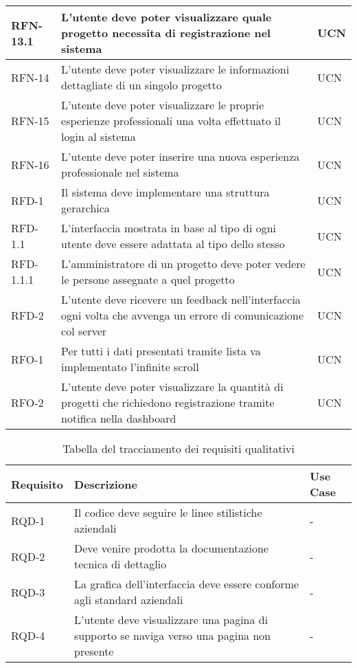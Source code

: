 \begin{table}
\begin{tabularx}{\textwidth}{lXl}
\hline
RFN-13.1 & L'utente deve poter visualizzare quale progetto necessita di registrazione nel sistema & UCN \\
\hline
RFN-14 & L'utente deve poter visualizzare le informazioni dettagliate di un singolo progetto & UCN \\
\hline
RFN-15 & L'utente deve poter visualizzare le proprie esperienze professionali una volta effettuato il login al sistema & UCN \\
\hline
RFN-16 & L'utente deve poter inserire una nuova esperienza professionale nel sistema & UCN \\
\hline
RFD-1 & Il sistema deve implementare una struttura gerarchica & UCN \\
\hline
RFD-1.1 & L'interfaccia mostrata in base al tipo di ogni utente deve essere adattata al tipo dello stesso & UCN \\
\hline
RFD-1.1.1 & L'amministratore di un progetto deve poter vedere le persone assegnate a quel progetto & UCN \\
\hline
RFD-2 & L'utente deve ricevere un feedback nell'interfaccia ogni volta che avvenga un errore di comunicazione col server & UCN \\
\hline
RFO-1 & Per tutti i dati presentati tramite lista va implementato l'infinite scroll & UCN \\
\hline
RFO-2 & L'utente deve poter visualizzare la quantità di progetti che richiedono registrazione tramite notifica nella dashboard & UCN \\
\hline
\end{tabularx}
\end{table}%

\begin{table}%
\caption{Tabella del tracciamento dei requisiti qualitativi}
\label{tab:requisiti-qualitativi}
\begin{tabularx}{\textwidth}{lXl}
\hline\hline
\textbf{Requisito} & \textbf{Descrizione} & \textbf{Use Case}\\
\hline
RQD-1 & Il codice deve seguire le linee stilistiche aziendali & - \\
\hline
RQD-2 & Deve venire prodotta la documentazione tecnica di dettaglio & - \\
\hline
RQD-3 & La grafica dell'interfaccia deve essere conforme agli standard aziendali & - \\
\hline
RQD-4 & L'utente deve visualizzare una pagina di supporto se naviga verso una pagina non presente & - \\
\hline
\end{tabularx}
\end{table}%

